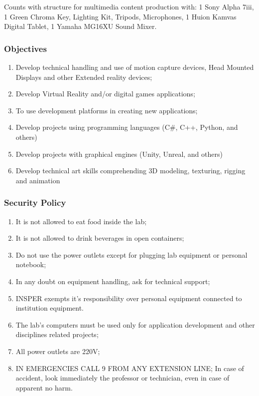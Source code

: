 Counts with structure for multimedia content production with: 1 Sony Alpha 7iii, 1 Green Chroma Key, Lighting Kit, Tripods, Microphones, 1 Huion Kamvas Digital Tablet, 1 Yamaha MG16XU Sound Mixer.

\newpage
\subsubsection{Objectives}

\begin{enumerate}
    \item Develop technical handling and use of motion capture devices, Head Mounted Displays and other Extended reality devices;
    \item Develop Virtual Reality and/or digital games applications;
    \item To use development platforms in creating new applications;
    \item Develop projects using programming languages (C\#, C++, Python, and others)
    \item Develop projects with graphical engines (Unity, Unreal, and others)
    \item Develop technical art skills comprehending 3D modeling, texturing, rigging and animation
\end{enumerate}
\newpage


\subsubsection{Security Policy}
\begin{enumerate}
    \item It is not allowed to eat food inside the lab;
    \item It is not allowed to drink beverages in open containers;
    \item Do not use the power outlets except for plugging lab equipment or personal notebook;
    \item In any doubt on equipment handling, ask for technical support;
    \item INSPER exempts it's responsibility over personal equipment connected to institution equipment.
    \item The lab's computers must be used only for application development and other disciplines related projects;
    \item All power outlets are 220V;
    \item {\color{red}IN EMERGENCIES CALL 9 FROM ANY EXTENSION LINE; In case of accident, look immediately the professor or technician, even in case of apparent no harm.}
\end{enumerate}

